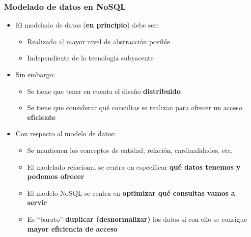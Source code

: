 \documentclass[14pt]{beamer}
\begin{document}
\begin{frame}
  \frametitle{Modelado de datos en NoSQL}
\begin{itemize}
\item El modelado de datos ({\bf en principio}) debe ser:
  \begin{itemize}
  \item Realizado al mayor nivel de abstracción posible
  \item Independiente de la tecnología subyacente
  \end{itemize}
\item Sin embargo:
  \begin{itemize}
  \item Se tiene que tener en cuenta el diseño {\bf distribuido}
  \item Se tiene que considerar qué consultas se realizan para ofrecer un
    acceso {\bf eficiente}
  \end{itemize}
\item Con respecto al modelo de datos:
\begin{itemize}
\item Se mantienen los conceptos de entidad, relación, cardinalidades, etc.
\item El modelado relacional se centra en especificar {\bf qué datos
    tenemos y podemos ofrecer}
\item El modelo NoSQL se centra en {\bf optimizar qué
    consultas vamos a servir}
\item Es ``barato'' {\bf duplicar (desnormalizar)} los datos si con ello se
  consigue {\bf mayor eficiencia de acceso}
\end{itemize}
\end{itemize}
\end{frame}
\end{document}
